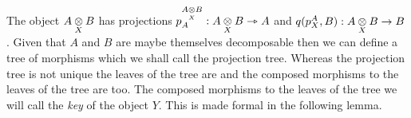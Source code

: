 \documentclass[10pt,a4paper]{scrartcl}
\begin{document}
\noindent The object $\crossx{A}{B}{X}$ has projections $\pc{\crossx{A}{B}{X}}{A}: \crossx{A}{B}{X} \smorph A$ and
$q(\pc{A}{X},B): \crossx{A}{B}{X} \morph B$. Given that  $A$ and $B$ are maybe themselves decomposable then we  can define a tree of morphisms which we shall call the projection tree. Whereas the projection tree is not unique the leaves of the tree are and the composed morphisms to the leaves of the tree are too. The composed morphisms to the leaves of the tree we
will call the \textit{key} of the object $Y$. This is made formal in the following lemma.






\end{document}
